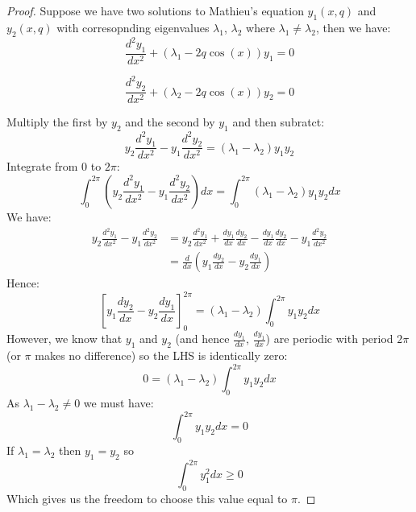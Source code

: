 \documentclass{article}
\begin{document}
\begin{proof}
    Suppose we have two solutions to Mathieu's equation $y_1(x, q)$ and $y_2(x, q)$ with corresopnding eigenvalues $\lambda_1$, $\lambda_2$ where $\lambda_1 \neq \lambda_2$, then we have:
    \begin{equation}
        \frac{d^2 y_1}{dx^2} + (\lambda_1 - 2 q \cos(x)) y_1 = 0
    \end{equation}

    \begin{equation}
        \frac{d^2 y_2}{dx^2} + (\lambda_2 - 2 q \cos(x)) y_2 = 0
    \end{equation}

    Multiply the first by $y_2$ and the second by $y_1$ and then subratct:
    \begin{equation}
        y_2 \frac{d^2 y_1}{dx^2} - y_1 \frac{d^2 y_2}{dx^2} = 
        (\lambda_1 - \lambda_2) y_1 y_2
    \end{equation}
    Integrate from $0$ to $2\pi$:
    \begin{equation}
        \int_{0}^{2\pi} \left( y_2 \frac{d^2y_1}{dx^2} - y_1 \frac{d^2y_2}{dx^2} \right) dx = \int_{0}^{2\pi} (\lambda_1 - \lambda_2) y_1 y_2 dx
    \end{equation}
    We have:
    \begin{align}
       y_2 \frac{d^2y_1}{dx^2} - y_1 \frac{d^2y_2}{dx^2} & = 
       y_2 \frac{d^2y_1}{dx^2} + \frac{dy_1}{dx} \frac{dy_2}{dx} - \frac{dy_1}{dx} 
       \frac{dy_2}{dx} - y_1 \frac{d^2y_2}{dx^2} \\
        & = \frac{d}{dx} \left( y_1 \frac{dy_2}{dx} - y_2 \frac{dy_1}{dx} \right)
    \end{align}
    Hence:
    \begin{equation}
        \left[ y_1 \frac{dy_2}{dx} - y_2 \frac{dy_1}{dx} \right]_{0}^{2\pi} = 
        (\lambda_1 - \lambda_2) \int_{0}^{2\pi} y_1 y_2 dx
    \end{equation}
    However, we know that $y_1$ and $y_2$ (and hence $\frac{dy_1}{dx}$, $\frac{dy_1}{dx}$) are periodic with period $2\pi$ (or $\pi$ makes no difference) so the LHS is identically zero:
    \begin{equation}
        0 = (\lambda_1 - \lambda_2) \int_{0}^{2\pi} y_1 y_2 dx
    \end{equation}
    As $\lambda_1 - \lambda_2 \neq 0$ we must have:
    \begin{equation}
        \int_{0}^{2\pi} y_1 y_2 dx = 0
    \end{equation}
    If $\lambda_1 = \lambda_2$ then $y_1 = y_2$ so 
    \begin{equation}
        \int_{0}^{2\pi} y_1^2dx \geq 0
    \end{equation}
    Which gives us the freedom to choose this value equal to $\pi$.
\end{proof}
\end{document}

